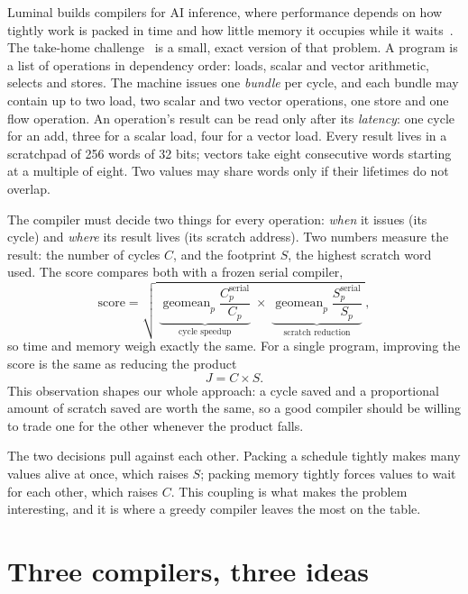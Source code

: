 \documentclass[11pt,a4paper]{article}
\begin{document}
Luminal builds compilers for AI inference, where performance depends on how
tightly work is packed in time and how little memory it occupies while it
waits~\cite{talent}. The take-home challenge~\cite{luminal} is a small, exact
version of that problem. A program is a list of operations in dependency order:
loads, scalar and vector arithmetic, selects and stores. The machine issues one
\emph{bundle} per cycle, and each bundle may contain up to two load, two scalar and
two vector operations, one store and one flow operation. An operation's result can
be read only after its \emph{latency}: one cycle for an add, three for a scalar
load, four for a vector load. Every result lives in a scratchpad of 256 words of
32 bits; vectors take eight consecutive words starting at a multiple of eight. Two
values may share words only if their lifetimes do not overlap.

The compiler must decide two things for every operation: \emph{when} it issues
(its cycle) and \emph{where} its result lives (its scratch address). Two numbers
measure the result: the number of cycles $C$, and the footprint $S$, the highest
scratch word used. The score compares both with a frozen serial compiler,
\begin{equation}\label{eq:score}
\text{score}=\sqrt{\;\underbrace{\operatorname{geomean}_p\frac{C^{\text{serial}}_p}{C_p}}_{\text{cycle speedup}}\;\times\;
\underbrace{\operatorname{geomean}_p\frac{S^{\text{serial}}_p}{S_p}}_{\text{scratch reduction}}\;} ,
\end{equation}
so time and memory weigh exactly the same. For a single program, improving the
score is the same as reducing the product
\begin{equation}\label{eq:j}
J = C\times S .
\end{equation}
This observation shapes our whole approach: a cycle saved and a proportional amount
of scratch saved are worth the same, so a good compiler should be willing to trade
one for the other whenever the product falls.

The two decisions pull against each other. Packing a schedule tightly makes many
values alive at once, which raises $S$; packing memory tightly forces values to wait
for each other, which raises $C$. This coupling is what makes the problem
interesting, and it is where a greedy compiler leaves the most on the table.

\section{Three compilers, three ideas}\label{sec:three}
\end{document}
